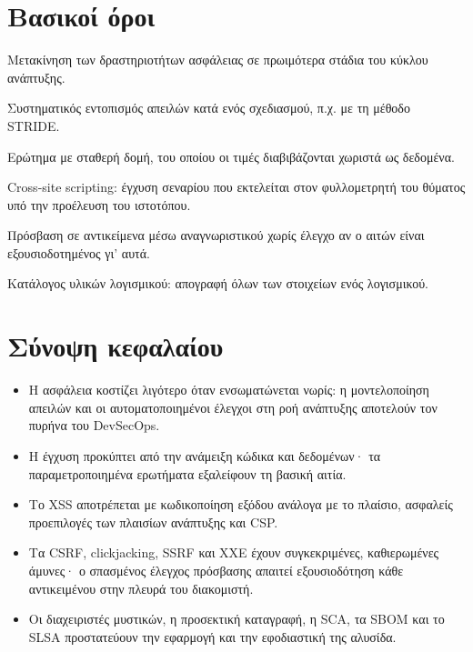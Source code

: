 \documentclass[11pt,openany]{book}
\begin{document}
\section*{Βασικοί όροι}
\begin{description}[style=nextline,leftmargin=1.2em]
  \item[Shift-left] Μετακίνηση των δραστηριοτήτων ασφάλειας σε πρωιμότερα στάδια του κύκλου ανάπτυξης.
  \item[Μοντελοποίηση απειλών] Συστηματικός εντοπισμός απειλών κατά ενός σχεδιασμού, π.χ. με τη μέθοδο STRIDE.
  \item[Παραμετροποιημένο ερώτημα] Ερώτημα με σταθερή δομή, του οποίου οι τιμές διαβιβάζονται χωριστά ως δεδομένα.
  \item[XSS] Cross-site scripting: έγχυση σεναρίου που εκτελείται στον φυλλομετρητή του θύματος υπό την προέλευση του ιστοτόπου.
  \item[IDOR / BOLA] Πρόσβαση σε αντικείμενα μέσω αναγνωριστικού χωρίς έλεγχο αν ο αιτών είναι εξουσιοδοτημένος γι' αυτά.
  \item[SBOM] Κατάλογος υλικών λογισμικού: απογραφή όλων των στοιχείων ενός λογισμικού.
\end{description}

\section*{Σύνοψη κεφαλαίου}
\begin{itemize}
  \item Η ασφάλεια κοστίζει λιγότερο όταν ενσωματώνεται νωρίς: η μοντελοποίηση απειλών και οι αυτοματοποιημένοι έλεγχοι στη ροή ανάπτυξης αποτελούν τον πυρήνα του DevSecOps.
  \item Η έγχυση προκύπτει από την ανάμειξη κώδικα και δεδομένων· τα παραμετροποιημένα ερωτήματα εξαλείφουν τη βασική αιτία.
  \item Το XSS αποτρέπεται με κωδικοποίηση εξόδου ανάλογα με το πλαίσιο, ασφαλείς προεπιλογές των πλαισίων ανάπτυξης και CSP.
  \item Τα CSRF, clickjacking, SSRF και XXE έχουν συγκεκριμένες, καθιερωμένες άμυνες· ο σπασμένος έλεγχος πρόσβασης απαιτεί εξουσιοδότηση κάθε αντικειμένου στην πλευρά του διακομιστή.
  \item Οι διαχειριστές μυστικών, η προσεκτική καταγραφή, η SCA, τα SBOM και το SLSA προστατεύουν την εφαρμογή και την εφοδιαστική της αλυσίδα.
\end{itemize}
\end{document}
